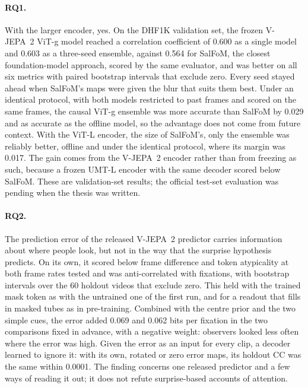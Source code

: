 \paragraph{RQ1.} With the larger encoder, yes. On the DHF1K validation set, the
frozen \acrshort{V-JEPA}~2 \acrshort{ViT}-g model reached a correlation coefficient of 0.600 as a
single model and 0.603 as a three-seed ensemble, against 0.564 for SalFoM, the
closest foundation-model approach, scored by the same evaluator, and was better
on all six metrics with paired bootstrap intervals that exclude zero. Every seed
stayed ahead when SalFoM's maps were given the blur that suits them best. Under
an identical protocol, with both models restricted to past frames and scored on
the same frames, the causal \acrshort{ViT}-g ensemble was more accurate than SalFoM by
0.029 and as accurate as the offline model, so the advantage does not come from
future context. With the \acrshort{ViT}-L encoder, the size of SalFoM's, only the
ensemble was reliably better, offline and under the identical protocol, where
its margin was 0.017. The gain comes from the \acrshort{V-JEPA}~2 encoder rather
than from freezing as such, because a frozen \acrshort{UMT}-L encoder with the same
decoder scored below SalFoM. These are validation-set results; the official
test-set evaluation was pending when the thesis was written.

\paragraph{RQ2.} The prediction error of the released \acrshort{V-JEPA}~2 predictor
carries information about where people look, but not in the way that the
surprise hypothesis predicts. On its own, it scored below frame difference and
token atypicality at both frame rates tested and was anti-correlated with
fixations, with bootstrap intervals over the 60 holdout videos that exclude
zero. This held with the trained mask token as with the untrained one of the
first run, and for a readout that fills in masked tubes as in pre-training.
Combined with the centre prior and the two simple cues, the error added 0.069
and 0.062 bits per fixation in the two comparisons fixed in advance, with a
negative weight: observers looked less often where the error was high. Given
the error as an input for every clip, a decoder learned to ignore it: with its
own, rotated or zero error maps, its holdout \acrshort{CC} was the same within
0.0001. The finding concerns one released predictor and a few ways of reading
it out; it does not refute surprise-based accounts of attention.

